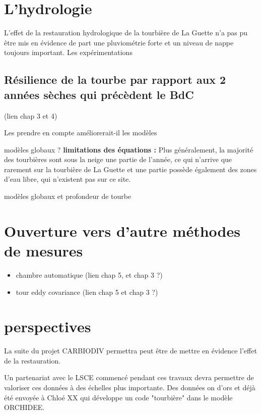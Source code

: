 \section*{L'hydrologie}

L'effet de la restauration hydrologique de la tourbière de La Guette n'a pas pu être mis en évidence de part une pluviométrie forte et un niveau de nappe toujours important.
Les expérimentations

\subsection*{Résilience de la tourbe par rapport aux 2 années sèches qui précèdent le BdC}
(lien chap 3 et 4)

%
%
%
%


Les prendre en compte améliorerait-il les modèles

modèles globaux ?
\textbf{limitations des équations :}
Plus généralement, la majorité des tourbières sont sous la neige une partie de l'année, ce qui n'arrive que rarement sur la tourbière de La Guette et une partie possède également des zones d'eau libre, qui n'existent pas sur ce site.

modèles globaux et profondeur de tourbe


\section*{Ouverture vers d'autre méthodes de mesures}
\begin{itemize}
\item chambre automatique (lien chap 5, et chap 3 ?)
\item tour eddy covariance (lien chap 5 et chap 3 ?)
\end{itemize}

\section*{perspectives}

La suite du projet CARBIODIV permettra peut être de mettre en évidence l'effet de la restauration.

Un partenariat avec le LSCE commencé pendant ces travaux devra permettre de valoriser ces données à des échelles plus importante.
Des données on d'ors et déjà été envoyée à Chloé XX qui développe un code "tourbière" dans le modèle ORCHIDEE.

